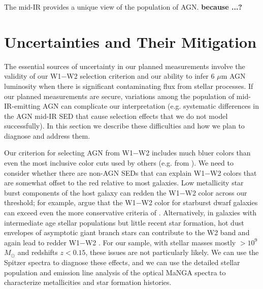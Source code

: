 \documentclass[12pt, preprint]{hacked-aastex}
\begin{document}
 The mid-IR provides a unique
view of the population of AGN. {\bf because ...?}


\section{Uncertainties and Their Mitigation}
\label{sec:difficulties}

The essential sources of uncertainty in our planned measurements involve 
the validity of our W1$-$W2 selection criterion and our ability to 
infer 6 $\mu$m AGN luminosity when there is significant contaminating
flux from stellar processes. If our planned measurements are secure, 
variations among the population of mid-IR-emitting AGN can complicate
our interpretation (e.g. systematic differences in the AGN mid-IR SED
that cause selection effects that we do not model successfully). In
this section we describe these difficulties and how we plan to 
diagnose and address them.

 Our criterion 
for selecting AGN from W1$-$W2 includes much bluer colors than even
the most inclusive color cuts used by others (e.g. from \cite{assef18a}). 
We need to consider whether there are non-AGN SEDs that can explain
W1$-$W2 colors that are somewhat offset to the red relative to most 
galaxies.  Low metallicity star burst components of the host galaxy
can redden the W1$-$W2 color across our threshold; for 
example, \cite{hainline16a} argue that the W1$-$W2 color
for starburst dwarf galaxies can exceed even the 
more conservative criteria of \cite{stern12a}.
Alternatively, in galaxies with intermediate age stellar 
populations but little recent star formation, hot 
dust envelopes of asymptotic giant branch stars can 
contribute to the W2 band and again lead to redder 
W1$-$W2 \cite{villaume15a}. For our sample, with  
stellar masses mostly $> 10^9$ $M_\odot$ and redshifts
$z<0.15$, these issues are not particularly likely. We can 
use the Spitzer spectra to diagnose these effects, and we 
can use the detailed stellar population and emission line
analysis of the  optical MaNGA spectra to characterize metallicities 
and star formation histories.
\end{document}
